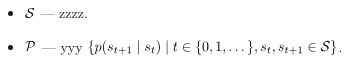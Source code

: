 \documentclass[../main.tex]{subfiles}
\begin{document}
%
%
%
%

\begin{definition} 
	\begin{itemize}
		\item $\mathcal{S}$ --- zzzz.
		\item $\mathcal{P}$ --- yyy $\{p(s_{t+1} \HM\mid s_t) \HM\mid t \HM\in \{0, 1, \dots \}, s_t, s_{t+1} \HM\in \St\}$.
	\end{itemize}
\end{definition}
%
%

\end{document}

